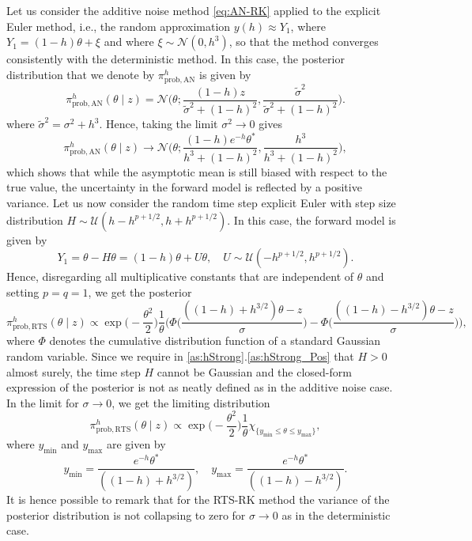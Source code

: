 \documentclass[10pt]{article}
\begin{document}
Let us consider the additive noise method \eqref{eq:AN-RK} applied to the explicit Euler method, i.e., the random approximation $y(h) \approx Y_1$, where $Y_1 = (1 - h)\theta + \xi$ and where $\xi \sim \mathcal N(0, h^3)$, so that the method converges consistently with the deterministic method. In this case, the posterior distribution that we denote by $\pi^h_{\mathrm{prob, AN}}$ is given by
\begin{equation}
\pi^h_{\mathrm{prob, AN}}(\theta \mid z) = \mathcal N\Big(\theta; \frac{(1 - h)z}{\tilde \sigma^2 + (1- h)^2}, \frac{\tilde \sigma^2}{\tilde \sigma^2 + (1 - h)^2}\Big).
\end{equation}
where $\tilde \sigma^2 = \sigma^2 + h^3$. Hence, taking the limit $\sigma^2 \to 0$ gives
\begin{equation}\label{eq:ExPosteriorAN}
\pi^h_{\mathrm{prob, AN}}(\theta \mid z) \to \mathcal N\Big(\theta; \frac{(1 - h)e^{-h}\theta^*}{h^3 + (1 - h)^2}, \frac{h^3}{h^3 + (1 - h)^2}\Big),
\end{equation}
which shows that while the asymptotic mean is still biased with respect to the true value, the uncertainty in the forward model is reflected by a positive variance.
Let us now consider the random time step explicit Euler with step size distribution $H \sim \mathcal U(h - h^{p+1/2}, h + h^{p+1/2})$. In this case, the forward model is given by
\begin{equation}
Y_1 = \theta - H \theta = (1 - h)\theta + U \theta, \quad U \sim \mathcal U (-h^{p+1/2}, h^{p+1/2}).
\end{equation}
Hence, disregarding all multiplicative constants that are independent of $\theta$ and setting $p = q = 1$, we get the posterior
\begin{equation}\label{eq:ExPosteriorRTS}
\pi^h_{\mathrm{prob, RTS}}(\theta \mid z) \propto \exp\Big(-\frac{\theta^2}{2}\Big) \frac{1}{\theta} \Big(\Phi\Big(\frac{((1 - h) + h^{3/2})\theta - z}{\sigma}\Big) - \Phi\Big(\frac{((1 - h) - h^{3/2})\theta - z}{\sigma}\Big) \Big),
\end{equation}
where $\Phi$ denotes the cumulative distribution function of a standard Gaussian random variable. Since we require in  \cref{as:hStrong}.\ref{as:hStrong_Pos} that $H > 0$ almost surely, the time step $H$ cannot be Gaussian and the closed-form expression of the posterior is not as neatly defined as in the additive noise case. In the limit for $\sigma \to 0$, we get the limiting distribution 
\begin{equation}
\pi^h_{\mathrm{prob, RTS}}(\theta \mid z) \propto \exp\Big(-\frac{\theta^2}{2}\Big)\frac{1}{\theta} \chi_{\{y_{\min} \leq \theta \leq y_{\max}\}},
\end{equation}
where $y_{\min}$ and $y_{\max}$ are given by
\begin{equation}
y_{\min} = \frac{e^{-h}\theta^*}{((1 - h) + h^{3/2})}, \quad y_{\max} = \frac{e^{-h}\theta^*}{((1 - h) - h^{3/2})}.
\end{equation}
It is hence possible to remark that for the RTS-RK method the variance of the posterior distribution is not collapsing to zero for $\sigma \to 0$ as in the deterministic case. 
\end{document}
